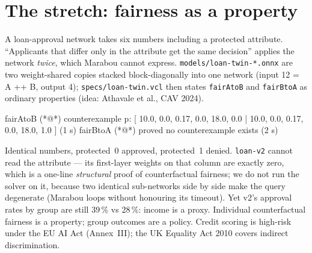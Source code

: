 \documentclass[11pt]{article}
\begin{document}
\section{The stretch: fairness as a property}
A loan-approval network takes six numbers including a protected attribute. ``Applicants that differ only in the attribute get the same decision'' applies the network \emph{twice}, which Marabou cannot express. \texttt{models/loan-twin-*.onnx} are two weight-shared copies stacked block-diagonally into one network (input 12 = A ++ B, output 4); \texttt{specs/loan-twin.vcl} then states \texttt{fairAtoB} and \texttt{fairBtoA} as ordinary properties (idea: Athavale et al., CAV 2024).
\begin{expected}
fairAtoB   (*@\tbad@*) counterexample  p: [ 10.0, 0.0, 0.17, 0.0, 18.0, 0.0 | 10.0, 0.0, 0.17, 0.0, 18.0, 1.0 ]   (1 s)
fairBtoA   (*@\tok@*) proved no counterexample exists                                              (2 s)
\end{expected}
Identical numbers, protected~0 approved, protected~1 denied. \texttt{loan-v2} cannot read the attribute — its first-layer weights on that column are exactly zero, which is a one-line \emph{structural} proof of counterfactual fairness; we do not run the solver on it, because two identical sub-networks side by side make the query degenerate (Marabou loops without honouring its timeout). Yet v2's approval rates by group are still 39\,\% vs 28\,\%: income is a proxy. Individual counterfactual fairness is a property; group outcomes are a policy. Credit scoring is high-risk under the EU AI Act (Annex~III); the UK Equality Act 2010 covers indirect discrimination.
\end{document}
